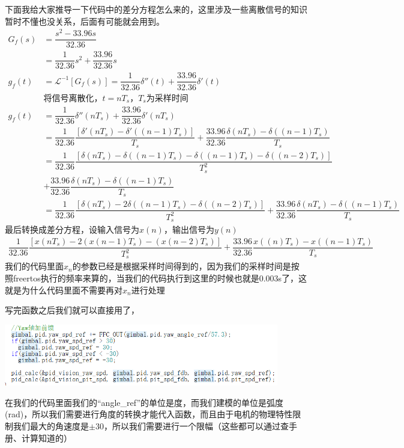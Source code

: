\documentclass[UTF8,a4paper,12pt]{ctexart}
\begin{document}
        下面我给大家推导一下代码中的差分方程怎么来的，这里涉及一些离散信号的知识暂时不懂也没关系，后面有可能就会用到。
        \begin{align*}
          G_f(s)&=\dfrac{s^2-33.96s}{32.36}\\
                &=\dfrac{1}{32.36}s^2+\dfrac{33.96}{32.36}s\\
            g_f(t)&=\mathcal{L}^{-1}{[G_f(s)]}=\dfrac{1}{32.36}\delta''\left( t \right)  + \dfrac{33.96}{32.36} \delta '\left( t \right)\\
            &\text{将信号离散化，$t=nT_s$，$T_s$为采样时间}\\
            g_f(t)&=\dfrac{1}{32.36}\delta''\left(nT_s \right)  + \dfrac{33.96}{32.36} \delta '\left(nT_s\right)\\
            &=\dfrac{1}{32.36}\dfrac{[\delta'(nT_s)-\delta'((n-1)T_s)]}{T_s} +  \dfrac{33.96}{32.36} \dfrac{\delta (nT_s)-\delta((n-1)T_s)}{T_s}\\
            &=\dfrac{1}{32.36}\dfrac{[\delta(nT_s)-\delta((n-1)T_s)-\delta((n-1)T_s)-\delta((n-2)T_s)]}{T_s^2} \\&+  \dfrac{33.96}{32.36} \dfrac{\delta (nT_s)-\delta((n-1)T_s)}{T_s}\\
            &=\dfrac{1}{32.36}\dfrac{[\delta(nT_s)-2\delta((n-1)T_s)-\delta((n-2)T_s)]}{T_s^2} +  \dfrac{33.96}{32.36} \dfrac{\delta (nT_s)-\delta((n-1)T_s)}{T_s}
        \end{align*}
        最后转换成差分方程，设输入信号为$x(n)$，输出信号为$y(n)$
        \begin{align*}
          \dfrac{1}{32.36}\dfrac{[x(nT_s)-2(x(n-1)T_s)-(x(n-2)T_s)]}{T_s^2} +  \dfrac{33.96}{32.36} \dfrac{x((n)T_s)-x((n-1)T_s)}{T_s}
        \end{align*} 
        我们的代码里面$x_n$的参数已经是根据采样时间得到的，因为我们的采样时间是按照freertos执行的频率来算的，当我们的代码执行到这里的时候也就是0.003s了，这就是为什么代码里面不需要再对$x_n$进行处理
        \begin{flushleft}
          写完函数之后我们就可以直接用了，
          \par \includegraphics[width=12cm]{picture/FFC_code.png}
        \end{flushleft}
        \begin{flushleft}
          在我们的代码里面我们的“angle\_ref”的单位是度，而我们建模的单位是弧度(rad)，所以我们需要进行角度的转换才能代入函数，而且由于电机的物理特性限制我们最大的角速度是$\pm 30$，所以我们需要进行一个限幅（这些都可以通过查手册、计算知道的）
        \end{flushleft}
        
\end{document}
